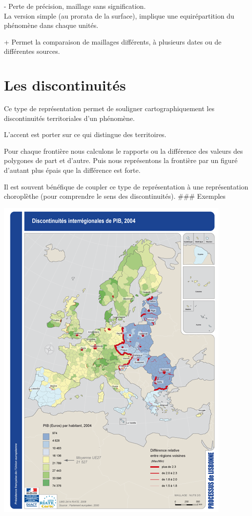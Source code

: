 \documentclass[]{book}
\begin{document}
- Perte de précision, maillage sans signification.\\
La version simple (au prorata de la surface), implique une equirépartition du phénomène dans chaque unités.

+ Permet la comparaison de maillages différents, à plusieurs dates ou de différentes sources.

\hypertarget{les-discontinuites}{%
\section{Les discontinuités}\label{les-discontinuites}}

Ce type de représentation permet de souligner cartographiquement les discontinuités territoriales d'un phénomène.

L'accent est porter sur ce qui distingue des territoires.

Pour chaque frontière nous calculons le rapports ou la différence des valeurs des polygones de part et d'autre. Puis nous représentons la frontière par un figuré d'autant plus épais que la différence est forte.

Il est souvent bénéfique de coupler ce type de représentation à une représentation choroplèthe (pour comprendre le sens des discontinuités).
\#\#\# Exemples

\includegraphics{img/disc1.png}
\end{document}
